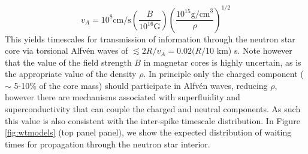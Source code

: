 \documentclass[12pt]{emulateapj}
\begin{document}
\begin{equation}
v_A = 10^8 \mathrm{cm/s} \left(\frac{B}{10^{16} \mathrm{G}}\right) \left(\frac{10^{15} \mathrm{g/cm}^3}{\rho}\right)^{1/2}
\end{equation}
This yields timescales for transmission of information through the neutron star core via torsional Alfv\'en waves of $\lesssim 2R/v_A = 0.02 (R/$10 km) s. Note however that the value of the field strength $B$ in magnetar cores is highly uncertain, as is the appropriate value of the density $\rho$. In principle only the charged component ($\sim$ 5-10\% of the core mass) should participate in Alfv\'en waves, reducing $\rho$, however there are mechanisms associated with superfluidity and superconductivity that can couple the charged and neutral components. As such this value is also consistent with the inter-spike timescale distribution. In Figure \ref{fig:wtmodels} (top panel panel), we show the expected distribution of waiting times for propagation through the neutron star interior. 
\end{document}
